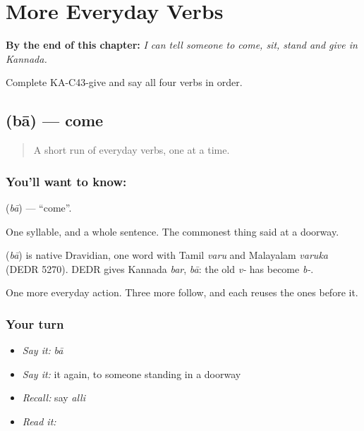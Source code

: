 
\chapter{More Everyday Verbs}
\label{ch:ka-more-verbs}

\begin{chapteropening}
\textbf{By the end of this chapter:} \emph{I can tell someone to come, sit, stand and give in Kannada.}

Complete KA-C43-give and say all four verbs in order.
\end{chapteropening}

\section[\texorpdfstring{\kn{ಬಾ} (bā)}{ಬಾ (bā)}]{ (bā) — come}

\label{lesson:KA-C43-come}



\begin{quote}
A short run of everyday verbs, one at a time.
\end{quote}

\subsection*{You'll want to know: }
\textbf{} (\emph{bā}) — \textquotedblleft{}come\textquotedblright{}.

One syllable, and a whole sentence. The commonest thing said at a doorway.

\begin{cousinweb}
\textbf{} (\emph{bā}) is native Dravidian, one word with Tamil \emph{varu} and Malayalam \emph{varuka} (DEDR 5270). DEDR gives Kannada \emph{bar}, \emph{bā}: the old \emph{v-} has become \emph{b-}.
\end{cousinweb}

\begin{grammarlens}[title={What you've built}]
One more everyday action. Three more follow, and each reuses the ones before it.
\end{grammarlens}

\subsection*{Your turn}
\begin{itemize}
\raggedright
  \item \emph{Say it:} \emph{bā}
  \item \emph{Say it:} it again, to someone standing in a doorway
  \item \emph{Recall:} say \emph{alli}
  \item \emph{Read it:} \textbf{}
\end{itemize}

